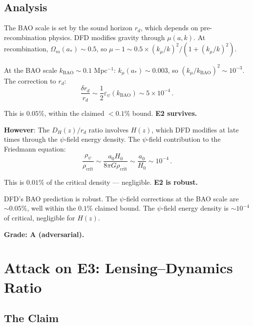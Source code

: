 \documentclass[11pt,a4paper]{article}
\begin{document}
\subsection{Analysis}

The BAO scale is set by the sound horizon $r_d$, which depends on pre-recombination physics. DFD modifies gravity through $\mu(a,k)$. At recombination, $\Omega_m(a_*) \sim 0.5$, so $\mu - 1 \sim 0.5 \times (k_\mu/k)^2/(1 + (k_\mu/k)^2)$.

At the BAO scale $k_{\mathrm{BAO}} \sim 0.1$ Mpc$^{-1}$: $k_\mu(a_*) \sim 0.003$, so $(k_\mu/k_{\mathrm{BAO}})^2 \sim 10^{-3}$. The correction to $r_d$:
\begin{equation}
\frac{\delta r_d}{r_d} \sim \frac{1}{2}\varepsilon_\psi(k_{\mathrm{BAO}}) \sim 5 \times 10^{-4}\,.
\end{equation}

This is $0.05\%$, within the claimed $< 0.1\%$ bound. \textbf{E2 survives.}

\textbf{However}: The $D_H(z)/r_d$ ratio involves $H(z)$, which DFD modifies at late times through the $\psi$-field energy density. The $\psi$-field contribution to the Friedmann equation:
\begin{equation}
\frac{\rho_\psi}{\rho_{\mathrm{crit}}} \sim \frac{a_0 H_0}{8\pi G \rho_{\mathrm{crit}}} \sim \frac{a_0}{H_0} \sim 10^{-4}\,.
\end{equation}

This is $0.01\%$ of the critical density --- negligible. \textbf{E2 is robust.}

\begin{tcolorbox}[colback=green!5!white, colframe=green!60!black, title={Agent 14: E2 Attack --- SURVIVES}]
DFD's BAO prediction is robust. The $\psi$-field corrections at the BAO scale are $\sim 0.05\%$, well within the $0.1\%$ claimed bound. The $\psi$-field energy density is $\sim 10^{-4}$ of critical, negligible for $H(z)$.

\textbf{Grade: A (adversarial).}
\end{tcolorbox}

\section{Attack on E3: Lensing--Dynamics Ratio}

\subsection{The Claim}
\end{document}
